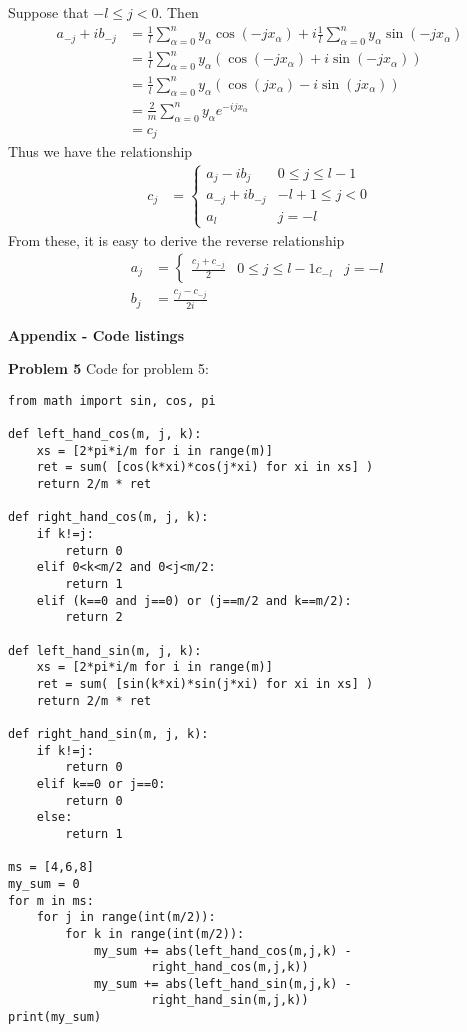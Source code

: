 \documentclass[12pt]{article}
\newcommand{\problem}[1]{\hspace{-4 ex} \large \textbf{Problem #1} }
\begin{document}
Suppose that $-l \leq j < 0$. Then
\begin{align*}
a_{-j} + ib_{-j} & = \frac{1}{l} \sum\limits_{\alpha=0}^{n} y_\alpha \cos(-j x_\alpha) + i \frac{1}{l}\sum\limits_{\alpha=0}^{n} y_\alpha \sin(-j x_\alpha) \\
& = \frac{1}{l} \sum\limits_{\alpha=0}^{n} y_\alpha \left( \cos(-j x_\alpha) + i\sin(-j x_\alpha) \right) \\
& = \frac{1}{l} \sum\limits_{\alpha=0}^{n} y_\alpha \left( \cos(j x_\alpha) - i\sin(j x_\alpha) \right) \\
& = \frac{2}{m} \sum\limits_{\alpha=0}^{n} y_\alpha e^{-ijx_\alpha} \\
& = c_j
\end{align*}
Thus we have the relationship 
\begin{align*}
	c_j &= \begin{cases}
		a_j - ib_j & 0\leq j \leq l-1 \\
		a_{-j} + ib_{-j} & -l+1 \leq j < 0 \\
		a_{l} & j=-l
	\end{cases}
\end{align*}
From these, it is easy to derive the reverse relationship
\begin{align*}
	a_j &= \begin{cases}
		\frac{c_j + c_{-j}}{2} & 0 \leq j \leq l-1
		c_{-l} & j=-l
	\end{cases} \\
	b_j &= \frac{c_j - c_{-j}}{2i}
\end{align*}

{\hspace{-4 ex} \large \textbf{Appendix - Code listings}}\bigbreak

\problem{5} Code for problem 5:
\begin{lstlisting}
from math import sin, cos, pi

def left_hand_cos(m, j, k):
	xs = [2*pi*i/m for i in range(m)]
	ret = sum( [cos(k*xi)*cos(j*xi) for xi in xs] )
	return 2/m * ret

def right_hand_cos(m, j, k):
	if k!=j:
		return 0
	elif 0<k<m/2 and 0<j<m/2:
		return 1
	elif (k==0 and j==0) or (j==m/2 and k==m/2):
		return 2	

def left_hand_sin(m, j, k):
	xs = [2*pi*i/m for i in range(m)]
	ret = sum( [sin(k*xi)*sin(j*xi) for xi in xs] )
	return 2/m * ret

def right_hand_sin(m, j, k):
	if k!=j:
		return 0
	elif k==0 or j==0:
		return 0
	else:
		return 1
		
ms = [4,6,8]
my_sum = 0
for m in ms:
	for j in range(int(m/2)):
		for k in range(int(m/2)):
			my_sum += abs(left_hand_cos(m,j,k) - 
					right_hand_cos(m,j,k))
			my_sum += abs(left_hand_sin(m,j,k) -
					right_hand_sin(m,j,k))
print(my_sum)
\end{lstlisting}
\end{document}

